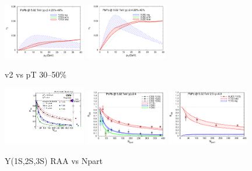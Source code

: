 \documentclass[../report.tex]{subfiles}
\begin{document}
\begin{figure}
\begin{center}
 \includegraphics[width=0.32\textwidth]{fig/theory/rapp_v2_1S.png}
 \includegraphics[width=0.32\textwidth]{fig/theory/rapp_v2_2S.png}
\end{center}

 \caption{v2 vs pT 30--50\%~\cite{Du:2017qkv}}
\end{figure}

\begin{figure}
\begin{center}
 \includegraphics[width=0.32\textwidth]{fig/cms/CMS-PAS-FTR-17-002_Figure_008-b.pdf}
 \includegraphics[width=0.32\textwidth]{fig/theory/rapp_raa_npart_CMS.png}
 \includegraphics[width=0.32\textwidth]{fig/theory/rapp_raa_npart_ALICE.png}
\end{center}

 \caption{Y(1S,2S,3S) RAA vs Npart\cite{CMS-PAS-FTR-17-002,Krouppa:2016jcl,Du:2017qkv}}
\end{figure}
\end{document}
